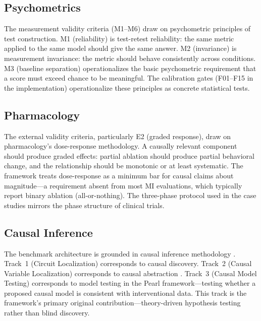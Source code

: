 \documentclass[10pt]{article}
\begin{document}
\subsection{Psychometrics}

The measurement validity criteria (M1--M6) draw on psychometric principles of test construction. M1 (reliability) is test-retest reliability: the same metric applied to the same model should give the same answer. M2 (invariance) is measurement invariance: the metric should behave consistently across conditions. M3 (baseline separation) operationalizes the basic psychometric requirement that a score must exceed chance to be meaningful. The calibration gates (F01--F15 in the implementation) operationalize these principles as concrete statistical tests.

\subsection{Pharmacology}

The external validity criteria, particularly E2 (graded response), draw on pharmacology's dose-response methodology. A causally relevant component should produce graded effects: partial ablation should produce partial behavioral change, and the relationship should be monotonic or at least systematic. The framework treats dose-response as a minimum bar for causal claims about magnitude---a requirement absent from most MI evaluations, which typically report binary ablation (all-or-nothing). The three-phase protocol used in the case studies mirrors the phase structure of clinical trials.

\subsection{Causal Inference}

The benchmark architecture is grounded in causal inference methodology \citep{pearl2009causality, spirtes2000causation}. Track~1 (Circuit Localization) corresponds to causal discovery. Track~2 (Causal Variable Localization) corresponds to causal abstraction \citep{geiger2023causal}. Track~3 (Causal Model Testing) corresponds to model testing in the Pearl framework---testing whether a proposed causal model is consistent with interventional data. This track is the framework's primary original contribution---theory-driven hypothesis testing rather than blind discovery.
\end{document}
